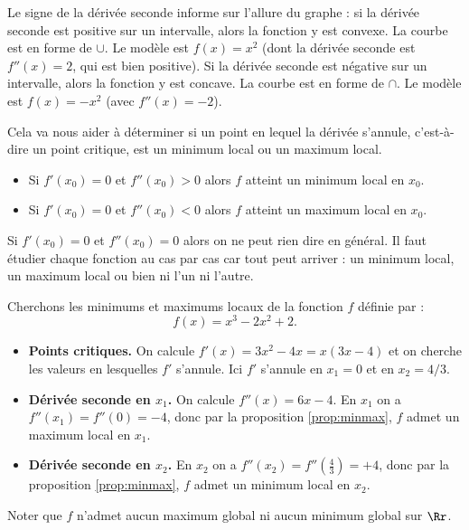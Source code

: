 \documentclass[11pt,class=report,crop=false]{standalone}
\begin{document}
Le signe de la dérivée seconde informe sur l'allure du graphe :
si la dérivée seconde est positive sur un intervalle, alors la fonction y est convexe. La courbe est en forme de $\cup$. Le modèle est $f(x)=x^2$ (dont la dérivée seconde est $f''(x)=2$, qui est bien positive).
Si la dérivée seconde est négative sur un intervalle, alors la fonction y est concave.  La courbe est en forme de $\cap$. Le modèle est $f(x)=-x^2$ (avec $f''(x)=-2$).



Cela va nous aider à déterminer si un point en lequel la dérivée s'annule, c'est-à-dire un point critique, est un minimum local ou un maximum local.


\begin{proposition}
\label{prop:minmax}
\sauteligne
\begin{itemize}
  \item Si $f'(x_0)=0$ et $f''(x_0)>0$ alors $f$ atteint un minimum local en $x_0$.
  
  \item Si $f'(x_0)=0$ et $f''(x_0)<0$ alors $f$ atteint un maximum local en $x_0$.
\end{itemize}
\end{proposition}

Si $f'(x_0)=0$ et $f''(x_0)=0$ alors on ne peut rien dire en général. Il faut étudier chaque fonction au cas par cas car tout peut arriver : un minimum local, un maximum local ou bien ni l'un ni l'autre. 


\begin{exemple}
Cherchons les minimums et maximums locaux de la fonction $f$ définie par :
$$f(x) = x^3-2x^2+2.$$

\begin{itemize}
  \item \textbf{Points critiques.}
  On calcule $f'(x) = 3x^2-4x = x(3x-4)$ et on cherche les valeurs en lesquelles $f'$ s'annule.
  Ici $f'$ s'annule en $x_1 = 0$ et en $x_2 = 4/3$.
  
  \item \textbf{Dérivée seconde en $x_1$.}
  On calcule $f''(x) = 6x-4$. 
  En $x_1$ on a $f''(x_1)=f''(0)=-4$, donc par la proposition \ref{prop:minmax},
  $f$ admet un maximum local en $x_1$.

  \item \textbf{Dérivée seconde en $x_2$.}
  En $x_2$ on a $f''(x_2) = f''(\frac43)=+4$, donc par la proposition \ref{prop:minmax}, $f$ admet un minimum local en $x_2$.
\end{itemize}


Noter que $f$ n'admet aucun maximum global ni aucun minimum global sur $\Rr$.
\end{exemple}
\end{document}
